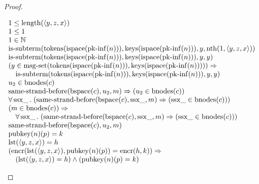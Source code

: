 \documentclass[11pt]{article}
\theoremstyle{plain}
\begin{document}
\begin{proof}
\begin{itemize}[leftmargin=2.8em, itemsep=4pt, parsep=1pt]
\begin{itemize}[leftmargin=2.8em, itemsep=4pt, parsep=1pt]
\begin{equation*}
\begin{array}{@{}l@{}}
1 \leq \operatorname{length}(\langle y, z, x \rangle) \\
1 \leq 1 \\
1 \in \mathbb{N} \\
\operatorname{is\text{-}subterm}(\operatorname{tokens}(\operatorname{ispace}(\operatorname{pk\text{-}inf}(n))), \operatorname{keys}(\operatorname{ispace}(\operatorname{pk\text{-}inf}(n))), y, \operatorname{nth}(1, \langle y, z, x \rangle)) \\
\operatorname{is\text{-}subterm}(\operatorname{tokens}(\operatorname{ispace}(\operatorname{pk\text{-}inf}(n))), \operatorname{keys}(\operatorname{ispace}(\operatorname{pk\text{-}inf}(n))), y, y) \\
\begin{array}{@{}l@{}} (y \in \operatorname{msg\text{-}set}(\operatorname{tokens}(\operatorname{ispace}(\operatorname{pk\text{-}inf}(n))), \operatorname{keys}(\operatorname{ispace}(\operatorname{pk\text{-}inf}(n))))) \Rightarrow  \\ \quad \operatorname{is\text{-}subterm}(\operatorname{tokens}(\operatorname{ispace}(\operatorname{pk\text{-}inf}(n))), \operatorname{keys}(\operatorname{ispace}(\operatorname{pk\text{-}inf}(n))), y, y) \end{array} \\
u_{2} \in \operatorname{bnodes}(c) \\
\operatorname{same\text{-}strand\text{-}before}(\operatorname{bspace}(c), u_{2}, m) \Rightarrow (u_{2} \in \operatorname{bnodes}(c)) \\
\forall \operatorname{ssx\_}.\; (\operatorname{same\text{-}strand\text{-}before}(\operatorname{bspace}(c), \operatorname{ssx\_}, m) \Rightarrow (\operatorname{ssx\_} \in \operatorname{bnodes}(c))) \\
\begin{array}{@{}l@{}} (m \in \operatorname{bnodes}(c)) \Rightarrow  \\ \quad \forall \operatorname{ssx\_}.\; (\operatorname{same\text{-}strand\text{-}before}(\operatorname{bspace}(c), \operatorname{ssx\_}, m) \Rightarrow (\operatorname{ssx\_} \in \operatorname{bnodes}(c))) \end{array} \\
\operatorname{same\text{-}strand\text{-}before}(\operatorname{bspace}(c), u_{2}, m) \\
\operatorname{pubkey}(n)(p) = k \\
\operatorname{lst}(\langle y, z, x \rangle) = h \\
\begin{array}{@{}l@{}} (\operatorname{encr}(\operatorname{lst}(\langle y, z, x \rangle), \operatorname{pubkey}(n)(p)) = \operatorname{encr}(h, k)) \Rightarrow  \\ \quad (\operatorname{lst}(\langle y, z, x \rangle) = h) \wedge (\operatorname{pubkey}(n)(p) = k) \end{array} \\

\end{array}
\end{equation*}
\end{itemize}
\end{itemize}
\end{proof}
\end{document}
